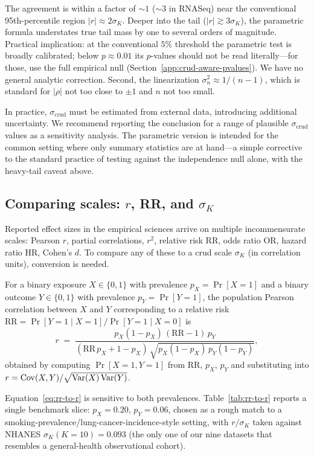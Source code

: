 The agreement is within a factor of $\sim 1$ ($\sim 3$ in RNASeq) near the conventional 95th-percentile region $|r|\approx 2\sigma_K$. Deeper into the tail ($|r|\gtrsim 3\sigma_K$), the parametric formula understates true tail mass by one to several orders of magnitude. Practical implication: at the conventional $5\%$ threshold the parametric test is broadly calibrated; below $p\approx 0.01$ its $p$-values should not be read literally---for those, use the full empirical null (Section~\ref{app:crud-aware-pvalues}). We have no general analytic correction.
Second, the linearization $\sigma_n^2\approx 1/(n-1)$, which is standard for $|\rho|$ not too close to $\pm 1$ and $n$ not too small.

In practice, $\sigma_{\mathrm{crud}}$ must be estimated from external data, introducing additional uncertainty.
We recommend reporting the conclusion for a range of plausible $\sigma_{\mathrm{crud}}$ values as a sensitivity analysis.
The parametric version is intended for the common setting where only summary statistics are at hand---a simple corrective to the standard practice of testing against the independence null alone, with the heavy-tail caveat above.


\subsection{Comparing scales: $r$, RR, and $\sigma_K$}
\label{app:scale-bridge}

Reported effect sizes in the empirical sciences arrive on multiple incommensurate scales: Pearson $r$, partial correlations, $r^2$, relative risk RR, odds ratio OR, hazard ratio HR, Cohen's $d$. To compare any of these to a crud scale $\sigma_K$ (in correlation units), conversion is needed.

For a binary exposure $X\in\{0,1\}$ with prevalence $p_X=\Pr[X=1]$ and a binary outcome $Y\in\{0,1\}$ with prevalence $p_Y=\Pr[Y=1]$, the population Pearson correlation between $X$ and $Y$ corresponding to a relative risk $\mathrm{RR}=\Pr[Y=1\mid X=1]/\Pr[Y=1\mid X=0]$ is
\begin{equation}\label{eq:rr-to-r}
r \;=\; \frac{p_X(1-p_X)\,(\mathrm{RR}-1)\,p_Y}{(\mathrm{RR}\,p_X + 1 - p_X)\,\sqrt{p_X(1-p_X)\,p_Y(1-p_Y)}},
\end{equation}
obtained by computing $\Pr[X=1,Y=1]$ from RR, $p_X$, $p_Y$ and substituting into $r=\operatorname{Cov}(X,Y)/\sqrt{\operatorname{Var}(X)\operatorname{Var}(Y)}$.

Equation~\eqref{eq:rr-to-r} is sensitive to both prevalences. Table~\ref{tab:rr-to-r} reports a single benchmark slice: $p_X=0.20$, $p_Y=0.06$, chosen as a rough match to a smoking-prevalence/lung-cancer-incidence-style setting, with $r/\sigma_K$ taken against NHANES $\sigma_K(K=10)=0.093$ (the only one of our nine datasets that resembles a general-health observational cohort).

